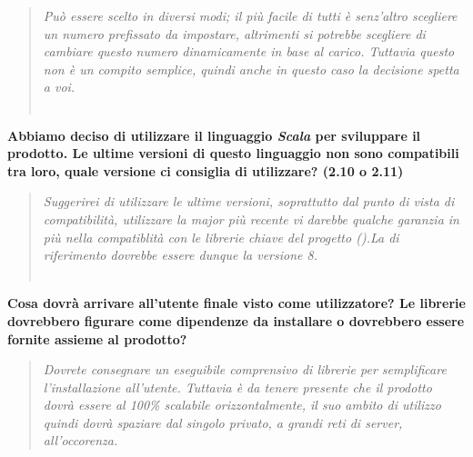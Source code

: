 \documentclass{scalatekids-article}
\begin{document}
\begin{quote}
  \textit{Può essere scelto in diversi modi; il più facile di tutti è senz'altro scegliere un numero prefissato da impostare, altrimenti si potrebbe scegliere di cambiare questo numero dinamicamente in base al carico. Tuttavia questo non è un compito semplice, quindi anche in questo caso la decisione spetta a voi.\\ \\}
\end{quote}
\textbf{Abbiamo deciso di utilizzare il linguaggio \textit{Scala} per sviluppare il prodotto. Le ultime versioni di questo linguaggio non sono compatibili tra loro, quale versione ci consiglia di utilizzare? (2.10 o 2.11)}
\begin{quote}
  \textit{Suggerirei di utilizzare le ultime versioni, soprattutto dal punto di
    vista di compatibilità, utilizzare la major più recente vi darebbe qualche
    garanzia in più nella compatiblità con le librerie chiave del progetto
    ().La  di riferimento dovrebbe essere dunque la
    versione 8.\\ \\}
\end{quote}
\textbf{Cosa dovrà arrivare all'utente finale visto come utilizzatore? Le librerie  dovrebbero figurare come dipendenze da installare o dovrebbero essere fornite assieme al prodotto?}
\begin{quote}
  \textit{Dovrete consegnare un eseguibile comprensivo di librerie
     per semplificare l'installazione all'utente. Tuttavia è da
    tenere presente che il prodotto dovrà essere al 100\% scalabile
    orizzontalmente, il suo ambito di utilizzo quindi dovrà spaziare dal singolo
    privato, a grandi reti di server, all'occorenza.}
\end{quote}
\end{document}
